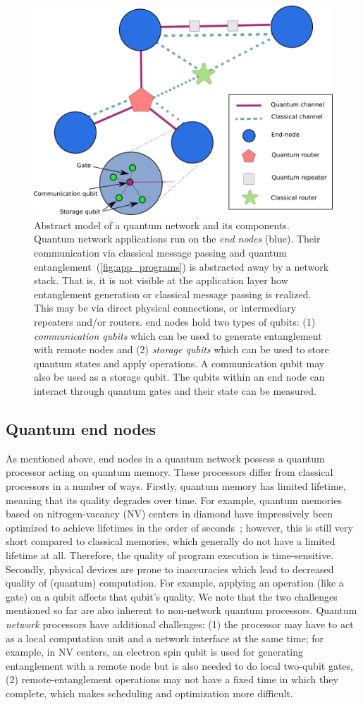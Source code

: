 \begin{figure}[t]
    \centering
    \includegraphics[width=0.4\linewidth]{figures/netqasm/network_model.png}
    \caption{
      Abstract model of a quantum network and its components.
      Quantum network applications run on the \emph{end nodes} (blue).
      Their communication via classical message passing and quantum entanglement~(\cref{fig:app_programs}) is abstracted away by a network stack.
      That is, it is not visible at the application layer how entanglement generation or classical message passing is realized.
      This may be via direct physical connections, or intermediary repeaters and/or routers.
      end nodes hold two types of qubits:
        (1) \emph{communication qubits} which can be used to generate entanglement with remote nodes and
        (2) \emph{storage qubits} which can be used to store quantum states and apply operations.
      A communication qubit may also be used as a storage qubit.
      The qubits within an end node can interact through quantum gates and their state can be measured.
    }
    \label{fig:network_model}
\end{figure}

\subsection{Quantum end nodes}
As mentioned above, end nodes in a quantum network possess a quantum processor acting on quantum memory.
These processors differ from classical processors in a number of ways.
Firstly, quantum memory has limited lifetime, meaning that its quality degrades over time.
For example, quantum memories based on nitrogen-vacancy (NV) centers in diamond have impressively been optimized to achieve lifetimes in the order of seconds~\cite{Abobeih2018};
however, this is still very short compared to classical memories, which generally do not have a limited lifetime at all.
Therefore, the quality of program execution is time-sensitive.
Secondly, physical devices are prone to inaccuracies which lead to decreased quality of (quantum) computation.
For example, applying an operation (like a gate) on a qubit affects that qubit's quality.
We note that the two challenges mentioned so far are also inherent to non-network quantum processors.
Quantum \textit{network} processors have additional challenges:
    (1) the processor may have to act as a local computation unit and a network interface at the same time;
    for example, in NV centers, an electron spin qubit is used for generating entanglement with a remote node but is also needed to do local two-qubit gates,
    (2) remote-entanglement operations may not have a fixed time in which they complete, which makes scheduling and optimization more difficult.

